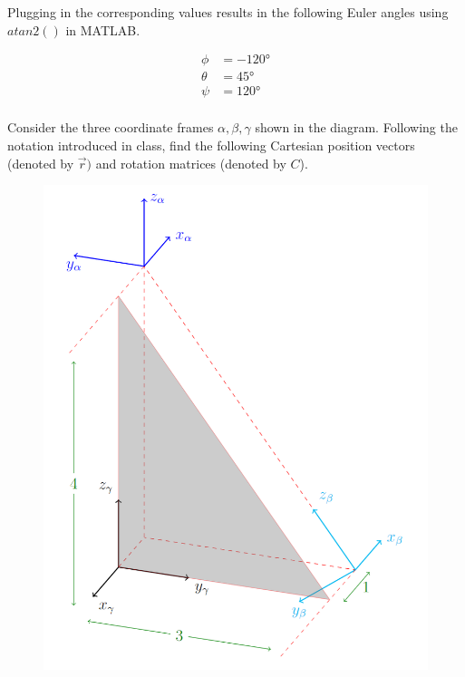 \documentclass[12pt,letterpaper, onecolumn]{exam}
\begin{document}
\begin{questions}
    Plugging in the corresponding values results in the following Euler angles using $atan2()$ in MATLAB.

    \begin{equation*}
        \begin{split}
            \phi & = -120 \unit{\degree} \\
            \theta & = 45 \unit{\degree} \\
            \psi & = 120 \unit{\degree} \\
        \end{split}
    \end{equation*}

    \clearpage
    \question
    Consider the three coordinate frames ${\alpha}, {\beta}, {\gamma}$ shown in the diagram. Following the notation introduced in class, find the following Cartesian position vectors (denoted by $\vec{r})$ and rotation matrices (denoted by $C$).

    \begin{figure}[!h]
        \centering
        \includegraphics[scale=0.75]{assets/HW2_P9_FIG.PNG}
    \end{figure}


\end{questions}
\end{document}
